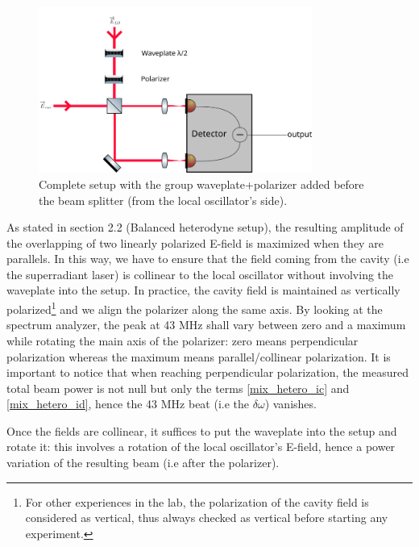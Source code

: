 \documentclass[11pt]{report}
\begin{document}
\begin{figure}[h!]
\centering
\includegraphics[width=0.8\textwidth]{heterodyne-wp}
\caption{Complete setup with the group waveplate+polarizer added before the beam splitter (from the local oscillator's side).}
\label{fig:heterodyne-wp}
\end{figure}

As stated in section 2.2 (Balanced heterodyne setup), the resulting amplitude of the overlapping of two linearly polarized E-field is maximized when they are parallels. In this way, we have to ensure that the field coming from the cavity (i.e the superradiant laser) is collinear to the local oscillator without involving the waveplate into the setup. In practice, the cavity field is maintained as vertically polarized\footnote{For other experiences in the lab, the polarization of the cavity field is considered as vertical, thus always checked as vertical before starting any experiment.} and we align the polarizer along the same axis. By looking at the spectrum analyzer, the peak at 43 MHz shall vary between zero and a maximum while rotating the main axis of the polarizer: zero means perpendicular polarization whereas the maximum means parallel/collinear polarization. It is important to notice that when reaching perpendicular polarization, the measured total beam power is not null but only the terms \eqref{mix_hetero_ic} and \eqref{mix_hetero_id}, hence the 43 MHz beat (i.e the $\delta\omega$) vanishes.

Once the fields are collinear, it suffices to put the waveplate into the setup and rotate it: this involves a rotation of the local oscillator's E-field, hence a power variation of the resulting beam (i.e after the polarizer).
\end{document}
